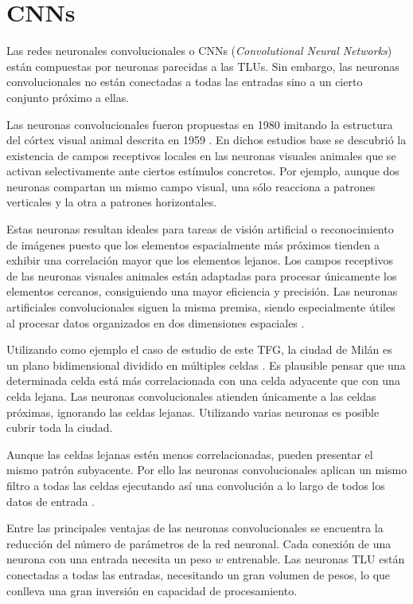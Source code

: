 \section{CNNs}
Las redes neuronales convolucionales o CNNs (\textit{Convolutional Neural Networks}) están compuestas por neuronas parecidas a las TLUs. Sin embargo, las neuronas convolucionales no están conectadas a todas las entradas sino a un cierto conjunto próximo a ellas.

Las neuronas convolucionales fueron propuestas en 1980 \cite{cnn1} imitando la estructura del córtex visual animal descrita en 1959 \cite{hubel1959}. En dichos estudios base se descubrió la existencia de campos receptivos locales en las neuronas visuales animales que se activan selectivamente ante ciertos estímulos concretos. Por ejemplo, aunque dos neuronas compartan un mismo campo visual, una sólo reacciona a patrones verticales y la otra a patrones horizontales.

Estas neuronas resultan ideales para tareas de visión artificial o reconocimiento de imágenes puesto que los elementos espacialmente más próximos tienden a exhibir una correlación mayor que los elementos lejanos. Los campos receptivos de las neuronas visuales animales están adaptadas para procesar únicamente los elementos cercanos, consiguiendo una mayor eficiencia y precisión. Las neuronas artificiales convolucionales siguen la misma premisa, siendo especialmente útiles al procesar datos organizados en dos dimensiones espaciales \cite{deeplearning,machinelearningbook}.

Utilizando como ejemplo el caso de estudio de este TFG, la ciudad de Milán es un plano bidimensional dividido en múltiples celdas \cite{milanogrid}. Es plausible pensar que una determinada celda está más correlacionada con una celda adyacente que con una celda lejana. Las neuronas convolucionales atienden únicamente a las celdas próximas, ignorando las celdas lejanas. Utilizando varias neuronas es posible cubrir toda la ciudad.

Aunque las celdas lejanas estén menos correlacionadas, pueden presentar el mismo patrón subyacente. Por ello las neuronas convolucionales aplican un mismo filtro a todas las celdas ejecutando así una convolución a lo largo de todos los datos de entrada \cite{cnn2}.

Entre las principales ventajas de las neuronas convolucionales se encuentra la reducción del número de parámetros de la red neuronal. Cada conexión de una neurona con una entrada necesita un peso $w$ entrenable. Las neuronas TLU están conectadas a todas las entradas, necesitando un gran volumen de pesos, lo que conlleva una gran inversión en capacidad de procesamiento.

